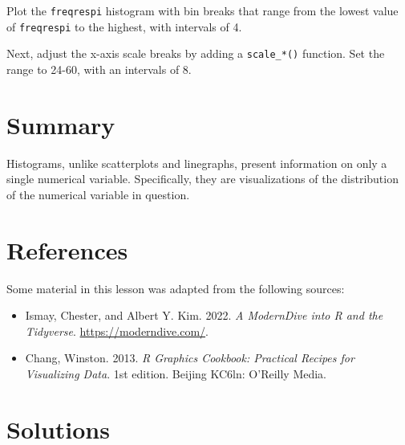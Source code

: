 \documentclass[
  letterpaper,
  DIV=11,
  numbers=noendperiod]{scrreprt}
\providecommand{\tightlist}{%
  \setlength{\itemsep}{0pt}\setlength{\parskip}{0pt}}\usepackage{longtable,booktabs,array}
\begin{document}
\begin{tcolorbox}[enhanced jigsaw, titlerule=0mm, colback=white, left=2mm, breakable, opacitybacktitle=0.6, colbacktitle=quarto-callout-tip-color!10!white, colframe=quarto-callout-tip-color-frame, bottomtitle=1mm, opacityback=0, coltitle=black, arc=.35mm, toptitle=1mm, title=\textcolor{quarto-callout-tip-color}{\faLightbulb}\hspace{0.5em}{Practice}, leftrule=.75mm, toprule=.15mm, bottomrule=.15mm, rightrule=.15mm]

Plot the \texttt{freqrespi} histogram with bin breaks that range from
the lowest value of \texttt{freqrespi} to the highest, with intervals of
4.

Next, adjust the x-axis scale breaks by adding a \texttt{scale\_*()}
function. Set the range to 24-60, with an intervals of 8.

\end{tcolorbox}

\section{Summary}\label{summary-1}

Histograms, unlike scatterplots and linegraphs, present information on
only a single numerical variable. Specifically, they are visualizations
of the distribution of the numerical variable in question.

\section*{References}\label{references-15}


Some material in this lesson was adapted from the following sources:

\begin{itemize}
\tightlist
\item
  Ismay, Chester, and Albert Y. Kim. 2022. \emph{A ModernDive into R and
  the Tidyverse}. \url{https://moderndive.com/}.
\item
  Chang, Winston. 2013. \emph{R Graphics Cookbook: Practical Recipes for
  Visualizing Data}. 1st edition. Beijing KC6ln: O'Reilly Media.
\end{itemize}

\section{Solutions}\label{solutions-12}
\end{document}
